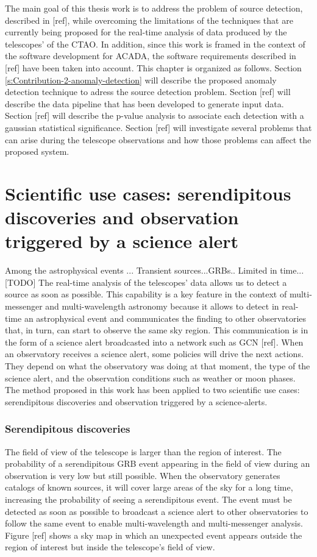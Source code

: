 The main goal of this thesis work is to address the problem of source detection, described in [ref], while overcoming the limitations of the techniques that are currently being proposed for the real-time analysis of data produced by the telescopes' of the CTAO. In addition, since this work is framed in the context of the software development for ACADA, the software requirements described in [ref] have been taken into account. This chapter is organized as follows. Section \autoref{s:Contribution-2-anomaly-detection} will describe the proposed anomaly detection technique to adress the source detection problem. Section [ref] will describe the data pipeline that has been developed to generate input data. Section [ref] will describe the p-value analysis to associate each detection with a gaussian statistical significance. Section [ref] will investigate several problems that can arise during the telescope observations and how those problems can affect the proposed system. 

\section{Scientific use cases: serendipitous discoveries and observation triggered by a science alert}
\label{s:Contribution-2-ues-cases}
Among the astrophysical events ...
Transient sources...GRBs..
Limited in time... [TODO]
The real-time analysis of the telescopes' data allows us to detect a source as soon as possible. This capability is a key feature in the context of multi-messenger and multi-wavelength astronomy because it allows to detect in real-time an astrophysical event and communicates the finding to other observatories that, in turn, can start to observe the same sky region. This communication is in the form of a science alert broadcasted into a network such as GCN [ref]. When an observatory receives a science alert, some policies will drive the next actions. They depend on what the observatory was doing at that moment, the type of the science alert, and the observation conditions such as weather or moon phases. The method proposed in this work has been applied to two scientific use cases: serendipitous discoveries and observation triggered by a science-alerts. 

\subsubsection{Serendipitous discoveries}
The field of view of the telescope is larger than the region of interest. The probability of a serendipitous GRB event appearing in the field of view during an observation is very low but still possible. When the observatory generates catalogs of known sources, it will cover large areas of the sky for a long time, increasing the probability of seeing a serendipitous event. The event must be detected as soon as possible to broadcast a science alert to other observatories to follow the same event to enable multi-wavelength and multi-messenger analysis. Figure [ref] shows a sky map in which an unexpected event appears outside the region of interest but inside the telescope's field of view.  




